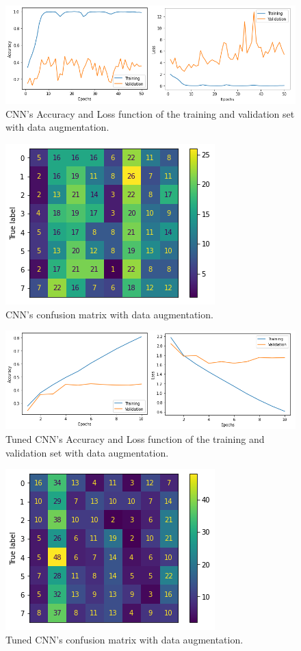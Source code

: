 \begin{figure}[ht]
\centering
\includegraphics[scale=0.6]{images/aug-2021-val-train.png}
\caption{CNN's Accuracy and Loss function of the training and validation set with data augmentation.}
\label{fig:Acc_Loss_2021_aug}
\end{figure}

\begin{figure}[ht]
\centering
\includegraphics[scale=0.6]{images/aug-2021-confusion_matrix.png}
\caption{CNN's confusion matrix with data augmentation.}
\label{fig:cf_2021_aug}
\end{figure}

\begin{figure}[ht]
\centering
\includegraphics[scale=0.6]{images/aug-tuned-val-train.png}
\caption{Tuned CNN's Accuracy and Loss function of the training and validation set with data augmentation.}
\label{fig:Acc_Loss_tuned_aug}
\end{figure}

\begin{figure}[ht]
\centering
\includegraphics[scale=0.6]{images/aug-tuned-confusion_matrix.png}
\caption{Tuned CNN's confusion matrix with data augmentation.}
\label{fig:cf_tuned_aug}
\end{figure}